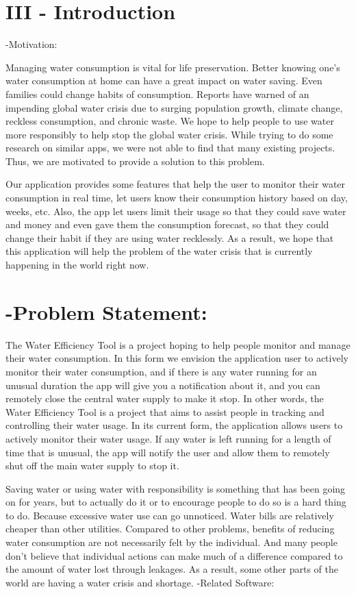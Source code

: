 \documentclass[10pt]{article}
\begin{document}
\section{III - Introduction}
-Motivation:

Managing water consumption is vital for life preservation. Better knowing one's water consumption at home can have a great impact on water saving. Even families could change habits of consumption. Reports have warned of an impending global water crisis due to surging population growth, climate change, reckless consumption, and chronic waste. We hope to help people to use water more responsibly to help stop the global water crisis. While trying to do some research on similar apps, we were not able to find that many existing projects. Thus, we are motivated to provide a solution to this problem.

Our application provides some features that help the user to monitor their water consumption in real time, let users know their consumption history based on day, weeks, etc. Also, the app let users limit their usage so that they could save water and money and even gave them the consumption forecast, so that they could change their habit if they are using water recklessly. As a result, we hope that this application will help the problem of the water crisis that is currently happening in the world right now.

\section{-Problem Statement:}
The Water Efficiency Tool is a project hoping to help people monitor and manage their water consumption. In this form we envision the application user to actively monitor their water consumption, and if there is any water running for an unusual duration the app will give you a notification about it, and you can remotely close the central water supply to make it stop. In other words, the Water Efficiency Tool is a project that aims to assist people in tracking and controlling their water usage. In its current form, the application allows users to actively monitor their water usage. If any water is left running for a length of time that is unusual, the app will notify the user and allow them to remotely shut off the main water supply to stop it.

Saving water or using water with responsibility is something that has been going on for years, but to actually do it or to encourage people to do so is a hard thing to do. Because excessive water use can go unnoticed. Water bills are relatively cheaper than other utilities. Compared to other problems, benefits of reducing water consumption are not necessarily felt by the individual. And many people don't believe that individual actions can make much of a difference compared to the amount of water lost through leakages. As a result, some other parts of the world are having a water crisis and shortage. -Related Software:
\end{document}
